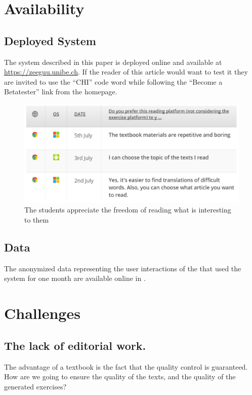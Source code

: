 


\section{Availability}

\subsection{Deployed System}
The system described in this paper is deployed online and available at \url{https://zeeguu.unibe.ch}. If the reader of this article would want to test it they are invited to use the ``CHI'' code word while following the  ``Become a Betatester'' link from the homepage.

\begin{figure}[h!]
\centering
  \includegraphics[width=0.9\columnwidth]{figures/opinion_on_reading_platform}
  \caption{The students appreciate the freedom of reading what is interesting to them }
\end{figure}

\subsection{Data}
The anonymized data representing the user interactions of the \students that used the system for one month are available online in . 




\newpage
\section{Challenges}

\subsection{The lack of editorial work.}
The advantage of a textbook is the fact that the quality control is guaranteed. How are we going to ensure the quality of the texts, and the quality of the generated exercises? 

